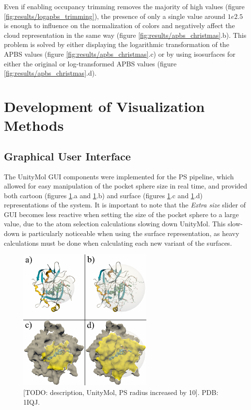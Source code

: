     Even if enabling occupancy trimming removes the majority of high values (figure \ref{fig:results/logapbs_trimming}), the presence of only a single value around $1e2.5$ is enough to influence on the normalization of colors and negatively affect the cloud representation in the same way (figure \ref{fig:results/apbs_christmas}.b). This problem is solved by either displaying the logarithmic transformation of the APBS values (figure \ref{fig:results/apbs_christmas}.c) or by using isosurfaces for either the original or log-transformed APBS values (figure \ref{fig:results/apbs_christmas}.d).


\section{Development of Visualization Methods}
  \subsection{Graphical User Interface}
    The UnityMol GUI components were implemented for the PS pipeline, which allowed for easy manipulation of the pocket sphere size in real time, and provided both cartoon (figures \ref{fig:results/gui_sphere}.a and \ref{fig:results/gui_sphere}.b) and surface (figures \ref{fig:results/gui_sphere}.c and \ref{fig:results/gui_sphere}.d) representations of the system. It is important to note that the \textit{Extra size} slider of GUI becomes less reactive when setting the size of the pocket sphere to a large value, due to the atom selection calculations slowing down UnityMol. This slow-down is particularly noticeable when using the surface representation, as heavy calculations must be done when calculating each new variant of the surfaces.

    \begin{figure}[H]
      \centering
      \includegraphics[width=0.6\textwidth]{figures/results/gui_sphere.png}
      \caption{\label{fig:results/gui_sphere} [TODO: description, UnityMol, PS radius increased by 10]. PDB: 1IQJ.}
    \end{figure}

